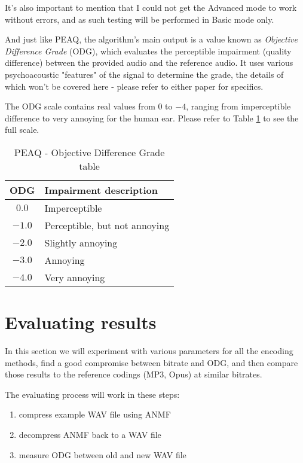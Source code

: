 It's also important to mention that I could not get the Advanced mode to work without errors, and as such testing will be performed in Basic mode only.

And just like PEAQ, the algorithm's main output is a value known as \emph{Objective Difference Grade} (ODG), which evaluates the perceptible impairment (quality difference) between the provided audio and the reference audio. It uses various psychoacoustic "features" of the signal to determine the grade, the details of which won't be covered here - please refer to either paper for specifics.

The ODG scale contains real values from $0$ to $-4$, ranging from imperceptible difference to very annoying for the human ear. Please refer to Table \ref{tab:odg_scale} to see the full scale.

\begin{table}[htbp]\caption{PEAQ - Objective Difference Grade table}
	\label{tab:odg_scale}
	\centering
	\begin{tabular}{|c|l|}
		\hline
		ODG & Impairment description \\ \hline
		$0.0$ & Imperceptible \\
		$-1.0$ & Perceptible, but not annoying \\
		$-2.0$ & Slightly annoying \\
		$-3.0$ & Annoying \\
		$-4.0$ & Very annoying \\
		\hline
	\end{tabular}
\end{table}

\section{Evaluating results}
In this section we will experiment with various parameters for all the encoding methods, find a good compromise between bitrate and ODG, and then compare those results to the reference codings (MP3, Opus) at similar bitrates.

The evaluating process will work in these steps:

\begin{enumerate}
	\item compress example WAV file using ANMF
	\item decompress ANMF back to a WAV file
	\item measure ODG between old and new WAV file
\end{enumerate}

